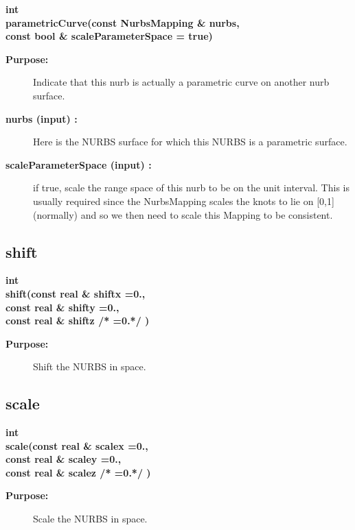 \begin{flushleft} \textbf{%
int   \\ 
\settowidth{\NurbsMappingIncludeArgIndent}{parametricCurve(}%
parametricCurve(const NurbsMapping \& nurbs,\\ 
\hspace{\NurbsMappingIncludeArgIndent}const bool \& scaleParameterSpace  = true)
}\end{flushleft}
\begin{description}
\item[{\bf Purpose:}] 
   Indicate that this nurb is actually a parametric curve on another nurb surface.
\item[{\bf nurbs (input) :}]  Here is the NURBS surface for which this NURBS is a parametric surface.
\item[{\bf scaleParameterSpace (input) :}]  if true, scale the range space of this nurb
   to be on the unit interval. This is usually required since the NurbsMapping scales
   the knots to lie on [0,1] (normally) and so we then need to scale this Mapping to
   be consistent.
\end{description}
\subsection{shift}
 
\begin{flushleft} \textbf{%
int  \\ 
\settowidth{\NurbsMappingIncludeArgIndent}{shift(}%
shift(const real \& shiftx  =0., \\ 
\hspace{\NurbsMappingIncludeArgIndent}const real \& shifty  =0., \\ 
\hspace{\NurbsMappingIncludeArgIndent}const real \& shiftz /* =0.*/ )
}\end{flushleft}
\begin{description}
\item[{\bf Purpose:}]  Shift the NURBS in space.
\end{description}
\subsection{scale}
 
\begin{flushleft} \textbf{%
int  \\ 
\settowidth{\NurbsMappingIncludeArgIndent}{scale(}%
scale(const real \& scalex  =0., \\ 
\hspace{\NurbsMappingIncludeArgIndent}const real \& scaley  =0., \\ 
\hspace{\NurbsMappingIncludeArgIndent}const real \& scalez /* =0.*/ )
}\end{flushleft}
\begin{description}
\item[{\bf Purpose:}]  Scale the NURBS in space.
\end{description}
